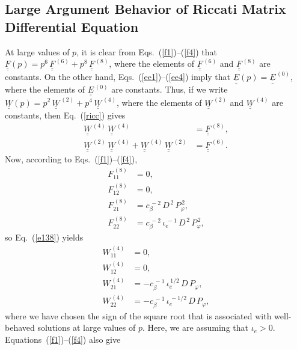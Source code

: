 \documentclass[12pt,prb,aps]{revtex4-1}
\begin{document}
\subsection{Large Argument Behavior of Riccati Matrix Differential Equation}
At large values of $p$, it is clear from Eqs.~(\ref{f1})--(\ref{f4}) that  $\underline{\underline{F}}(p)=p^6\,\underline{\underline{F}}^{\,(6)}+ p^8\,\underline{\underline{F}}^{\,(8)}$, where the elements of $\underline{\underline{F}}^{\,(6)}$ and $\underline{\underline{F}}^{\,(8)}$ are constants.
On the other hand, Eqs.~(\ref{ee1})--(\ref{ee4}) imply that $\underline{\underline{E}}(p)=\underline{\underline{E}}^{\,(0)}$, 
where the elements of $\underline{\underline{E}}^{\,(0)}$ are constants. 
Thus, if we write $\underline{\underline{W}}(p) = p^2\,\underline{\underline{W}}^{\,(2)}+p^4\,\underline{\underline{W}}^{\,(4)}$,
where the elements of $\underline{\underline{W}}^{\,(2)}$ and  $\underline{\underline{W}}^{\,(4)}$ are constants, then Eq.~(\ref{ricc}) gives 
\begin{align}\label{e138}
\underline{\underline{W}}^{\,(4)}\,\underline{\underline{W}}^{\,(4)}&= \underline{\underline{F}}^{\,(8)},\\[0.5ex]
\underline{\underline{W}}^{\,(2)}\,\underline{\underline{W}}^{\,(4)}+ \underline{\underline{W}}^{\,(4)}\,\underline{\underline{W}}^{\,(2)}&= 
\underline{\underline{F}}^{\,(6)}.\label{e139}
\end{align}
Now, according to Eqs.~(\ref{f1})--(\ref{f4}), 
\begin{align}
F^{\,(8)}_{11} &=0,\\[0.5ex]
F^{\,(8)}_{12} &= 0,\\[0.5ex]
F^{\,(8)}_{21} &= c_\beta^{\,-2}\,D^{\,2}\,P_\varphi^{\,2},\\[0.5ex]
F^{\,(8)}_{22} &= c_\beta^{\,-2}\,\iota_e^{\,-1}\,D^{\,2}\,P_\varphi^{\,2},
\end{align}
so Eq.~(\ref{e138}) yields 
\begin{align}
W^{\,(4)}_{11} &=0,\\[0.5ex]
W^{\,(4)}_{12} &= 0,\\[0.5ex]
W^{\,(4)}_{21} &= -c_\beta^{\,-1}\,\iota_e^{\,1/2}\,D\,P_\varphi,\\[0.5ex]
W^{\,(4)}_{22} &=-c_\beta^{\,-1}\,\iota_e^{\,-1/2}\, D\,P_\varphi,
\end{align}
where we have chosen the sign of the square root that is associated with well-behaved solutions at large values of $p$. Here, we are  assuming that $\iota_e>0$. 
Equations~(\ref{f1})--(\ref{f4}) also give 
\end{document}
